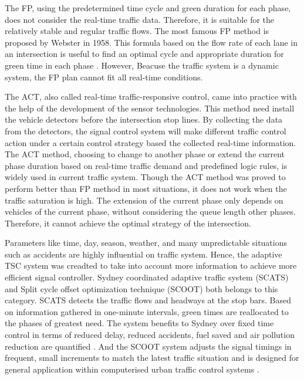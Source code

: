 \documentclass[a4paper, 10pt, conference]{ieeeconf}      %
\begin{document}
The FP, using the predetermined time cycle and green duration for each phase, does not consider the real-time traffic data. Therefore, it 
is suitable for the relatively stable and regular traffic flows. The most famous FP method is proposed by Webster in 
1958. This formula based on the flow rate of each lane in an intersection
is useful to find an optimal cycle and appropriate duration for green time in each phase \cite{webster1958traffic}.
However, Beacuse the traffic system is a dynamic system, the FP plan cannot fit all real-time conditions. 

The ACT, also called real-time traffic-responsive control, came into practice with the help of the development of the sensor technologies. 
This method need install the vehicle detectors before the intersection stop lines. By collecting the data from the detectors, the 
signal control system will make different traffic control action under a certain control strategy based the collected real-time information.
The ACT method, choosing to change to another phase or extend the current phase duration based on
real-time traffic demand and predefined logic rules, is widely used in current traffic system. 
Though the ACT method was proved to perform better than FP method in most situations, 
it does not work when the traffic saturation is high. The extension of the current phase only depends on vehicles of the current phase, 
without considering the queue length other phases. Therefore, it cannot achieve the optimal strategy of the intersection. 

Parameters like time, day, season, weather, and many unpredictable situations such as accidents are highly influential on traffic system. 
Hence, the adaptive TSC system was creadted to take into account more information to achieve more efficient signal controller.  
Sydney coordinated adaptive traffic system (SCATS) and Split cycle offset optimization technique (SCOOT) both belongs to this category. 
SCATS detects the traffic flows and headways at the stop bars. Based on information gathered in one-minute intervals, 
green times are reallocated to the phases of greatest need. The system benefits to Sydney over fixed time control 
in terms of reduced delay, reduced accidents, fuel saved and air pollution reduction are quantified \cite{sims1981scat}.
And the SCOOT system adjusts the signal timings in frequent, small increments to match the latest traffic situation and 
is designed for general application within computerised urban traffic control systems \cite{hunt1981scoot}.
\end{document}

